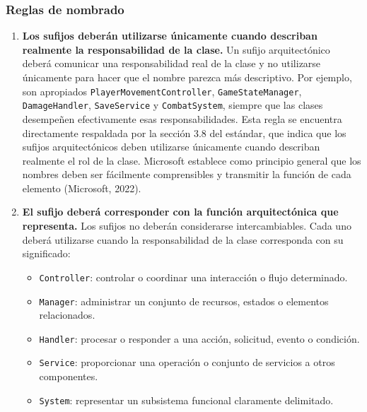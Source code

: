 
\subsubsection{Reglas de nombrado}

\begin{enumerate}

\item \textbf{Los sufijos deberán utilizarse únicamente cuando describan realmente la responsabilidad de la clase.} Un sufijo arquitectónico deberá comunicar una responsabilidad real de la clase y no utilizarse únicamente para hacer que el nombre parezca más descriptivo. Por ejemplo, son apropiados \texttt{PlayerMovementController}, \texttt{GameStateManager}, \texttt{DamageHandler}, \texttt{SaveService} y \texttt{CombatSystem}, siempre que las clases desempeñen efectivamente esas responsabilidades. Esta regla se encuentra directamente respaldada por la sección 3.8 del estándar, que indica que los sufijos arquitectónicos deben utilizarse únicamente cuando describan realmente el rol de la clase. Microsoft establece como principio general que los nombres deben ser fácilmente comprensibles y transmitir la función de cada elemento (Microsoft, 2022).

\item \textbf{El sufijo deberá corresponder con la función arquitectónica que representa.} Los sufijos no deberán considerarse intercambiables. Cada uno deberá utilizarse cuando la responsabilidad de la clase corresponda con su significado:

\begin{itemize}

\item \texttt{Controller}: controlar o coordinar una interacción o flujo determinado.

\item \texttt{Manager}: administrar un conjunto de recursos, estados o elementos relacionados.

\item \texttt{Handler}: procesar o responder a una acción, solicitud, evento o condición.

\item \texttt{Service}: proporcionar una operación o conjunto de servicios a otros componentes.

\item \texttt{System}: representar un subsistema funcional claramente delimitado.


\end{itemize}
\end{enumerate}
